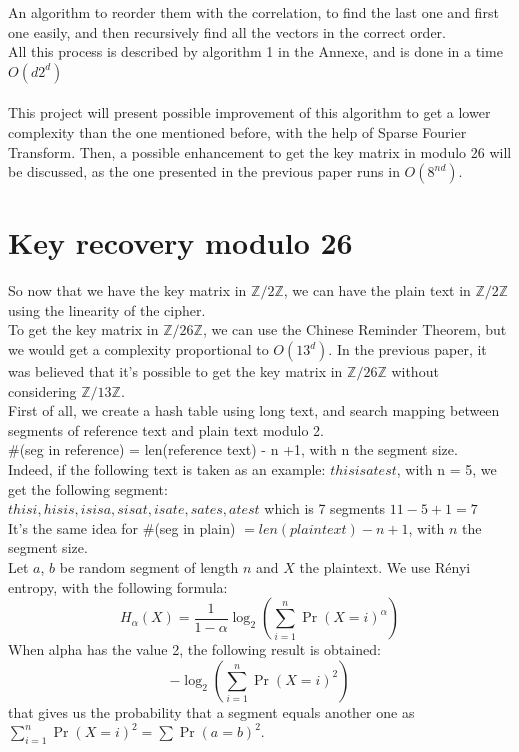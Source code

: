 \documentclass{article}
\begin{document}
An algorithm to reorder them with the correlation, to find the last one and first one easily, and then recursively find all the vectors in the correct order.\\
All this process is described by algorithm 1 in the Annexe, and is done in a time $O(d 2^d)$\\
\\
This project will present possible improvement of this algorithm to get a lower complexity than the one mentioned before, with the help of Sparse Fourier Transform. Then, a possible enhancement to get the key matrix in modulo 26 will be discussed, as the one presented in the previous paper runs in $O(8^{nd})$.\\


\section{Key recovery modulo 26}
So now that we have the key matrix in $\mathbb{Z}/2\mathbb{Z}$, we can have the plain text in $\mathbb{Z}/2\mathbb{Z}$ using the linearity of the cipher.\\
To get the key matrix in $\mathbb{Z}/26\mathbb{Z}$, we can use the Chinese Reminder Theorem, but we would get a complexity proportional to $O(13^d)$. In the previous paper, it was believed that it's possible to get the key matrix in $\mathbb{Z}/26\mathbb{Z}$ without considering $\mathbb{Z}/13\mathbb{Z}$.\\
First of all, we create a hash table using long text, and search mapping between segments of reference text and plain text modulo 2.\\
\#(seg in reference) = len(reference text) - n +1, with n the segment size.\\
Indeed, if the following text is taken as an example: $thisisatest$, with n = 5, we get the following segment:\\
 $ thisi, hisis, isisa, sisat, isate, sates, atest $ which is 7 segments $ 11 - 5 + 1 = 7 $\\
It's the same idea for \#(seg in plain) $= len(plain text) - n +1$, with $n$ the segment size.\\
Let $a$, $b$ be random segment of length $n$ and $X$ the plaintext. We use R\'enyi entropy, with the following formula:\\
$$H_{\alpha}(X) = \frac{1}{1-\alpha}\log_{2}(\sum_{i=1}^{n}{\Pr(X=i)^{\alpha}})$$ 
When alpha has the value 2, the following result is obtained:
$$-\log_{2}(\sum_{i=1}^{n}{\Pr(X=i)^{2}})$$ that gives us the probability that a segment equals another one as $\sum_{i=1}^{n}{\Pr(X=i)^{2}} = \sum{\Pr(a=b)^{2}}$.\\
\end{document}
